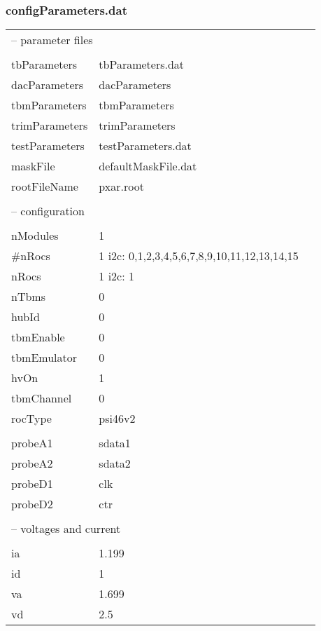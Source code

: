 \documentclass[british,11pt,a4paper]{memoir}
\begin{document}
\subsubsection{configParameters.dat}
\ubuntu
\begin{tabular}{llr}
\hline
\multicolumn{2}{l}{-- parameter files}		\\
	&				\\
tbParameters	&	tbParameters.dat			\\
dacParameters	&	dacParameters			\\
tbmParameters	&	tbmParameters			\\
trimParameters	&	trimParameters			\\
testParameters	&	testParameters.dat			\\
maskFile	&	defaultMaskFile.dat			\\
rootFileName	&	pxar.root			\\
	&				\\
\multicolumn{2}{l}{-- configuration}	\\
	&				\\
nModules	&	1			\\
\#nRocs	&	1	i2c:	0,1,2,3,4,5,6,7,8,9,10,11,12,13,14,15	\\
nRocs	&	1	i2c:	1	\\
nTbms	&	0			\\
hubId	&	0			\\
tbmEnable	&	0			\\
tbmEmulator	&	0			\\
hvOn	&	1			\\
tbmChannel	&	0			\\
rocType	&	psi46v2			\\
	&				\\
probeA1	&	sdata1			\\
probeA2	&	sdata2			\\
probeD1	&	clk			\\
probeD2	&	ctr			\\
	&				\\
\multicolumn{2}{l}{-- voltages and current}	\\
	&				\\
ia	&	1.199			\\
id	&	1			\\
va	&	1.699			\\
vd	&	2.5			\\

\hline
\end{tabular}
\end{document}
